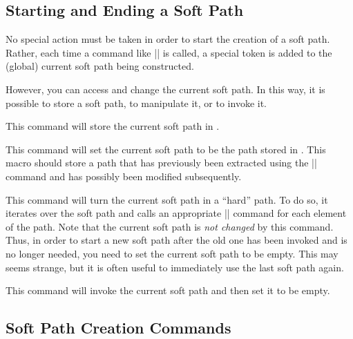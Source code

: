 \subsection{Starting and Ending a Soft Path}

No special action must be taken in order to start the creation of a
soft path. Rather, each time a command like |\pgfsyssoftpath@lineto|
is called, a special token is added to the (global) current soft path
being constructed.

However, you can access and change the current soft path. In this way,
it is possible to store a soft path, to manipulate it, or to invoke
it.

\begin{command}{\pgfsyssoftpath@getcurrentpath{}}
  This command will store the current soft path in .
\end{command}

\begin{command}{\pgfsyssoftpath@setcurrentpath{}}
  This command will set the current soft path to be the path stored in
  . This macro should store a path that has
  previously been extracted using the |\pgfsyssoftpath@getcurrentpath|
  command and has possibly been modified subsequently.
\end{command}

\begin{command}{\pgfsyssoftpath@invokecurrentpath}
  This command will turn the current soft path in a ``hard'' path. To
  do so, it iterates over the soft path and calls an appropriate
  |\pgfsys@xxxx| command for each element of the path. Note that the
  current soft path is \emph{not changed} by this command. Thus, in
  order to start a new soft path after the old one has been invoked
  and is no longer needed, you need to set the current soft path to be
  empty. This may seems strange, but it is often useful to immediately
  use the last soft path again.
\end{command}

\begin{command}{\pgfsyssoftpath@flushcurrentpath}
  This command will invoke the current soft path and then set it to be
  empty.
\end{command}



\subsection{Soft Path Creation Commands}

